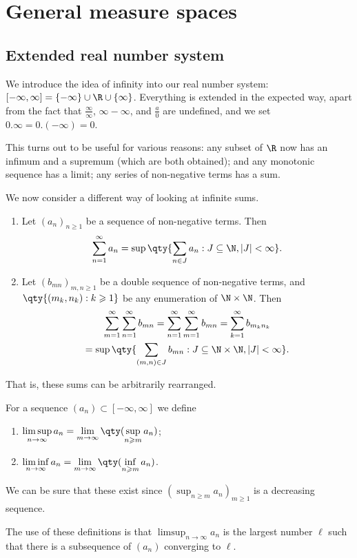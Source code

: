\documentclass{maths}
\begin{document}
\section{General measure spaces}

\subsection{Extended real number system}

We introduce the idea of infinity into our real number system: $[-\infty,\infty]=\{-\infty\}\cup\R\cup\{\infty\}$.
Everything is extended in the expected way, apart from the fact that $\frac{\infty}{\infty}$, $\infty-\infty$, and $\frac{a}{0}$ are undefined, and we set $0.\infty=0.(-\infty)=0$.

This turns out to be useful for various reasons: any subset of $\R$ now has an infimum and a supremum (which are both obtained); and any monotonic sequence has a limit; any series of non-negative terms has a sum.

We now consider a different way of looking at infinite sums.

\begin{prop}
    \begin{enumerate}
        \item Let $(a_n)_{n\geqslant1}$ be a sequence of non-negative terms.
        Then
        \[
            \sum_{n=1}^{\infty} a_n =
            \sup\qty{\sum_{n\in J} a_n : J\subseteq\N,|J|<\infty}.
        \]
        \item Let $(b_{mn})_{m,n\geqslant1}$ be a double sequence of non-negative terms, and $\qty{(m_k,n_k) : k\geqslant1}$ be any enumeration of $\N\times\N$.
        Then
        \begin{gather*}
            \sum_{m=1}^{\infty}\sum_{n=1}^{\infty} b_{mn} =
            \sum_{n=1}^{\infty}\sum_{m=1}^{\infty} b_{mn} =
            \sum_{k=1}^{\infty} b_{m_kn_k}\\
            =\sup\qty{\sum_{(m,n)\in J} b_{mn} : J\subseteq\N\times\N,|J|<\infty}.
        \end{gather*}
    \end{enumerate}
    That is, these sums can be arbitrarily rearranged.
\end{prop}

\begin{defn}
    For a sequence $(a_n)\subset[-\infty,\infty]$ we define
    \begin{enumerate}
        \item $\limsup\limits_{n\to\infty} a_n = \lim\limits_{m\to\infty}\qty(\sup\limits_{n\geqslant m} a_n)$;
        \item $\liminf\limits_{n\to\infty} a_n = \lim\limits_{m\to\infty}\qty(\inf\limits_{n\geqslant m} a_n)$.
    \end{enumerate}
    We can be sure that these exist since $(\sup_{n\geqslant m} a_n)_{m\geqslant1}$ is a decreasing sequence.

    The use of these definitions is that $\limsup_{n\to\infty} a_n$ is the largest number $\ell$ such that there is a subsequence of $(a_n)$ converging to $\ell$.
\end{defn}
\end{document}
